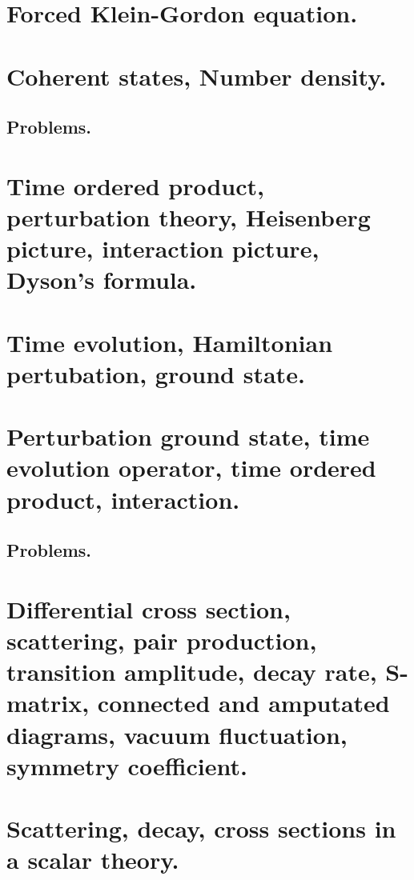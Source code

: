    \chapter{Forced Klein-Gordon equation.}
      
   \chapter{Coherent states, Number density.}
      
      \section{Problems.}
         
   \chapter{Time ordered product, perturbation theory, Heisenberg picture, interaction picture, Dyson's formula.}
      
      
   \chapter{Time evolution, Hamiltonian pertubation, ground state.}
      
   \chapter{Perturbation ground state, time evolution operator, time ordered product, interaction.}
      
      
      \section{Problems.}
         
         
   \chapter{Differential cross section, scattering, pair production, transition amplitude, decay rate, S-matrix, connected and amputated diagrams, vacuum fluctuation, symmetry coefficient.}
      
   \chapter{Scattering, decay, cross sections in a scalar theory.}
      

